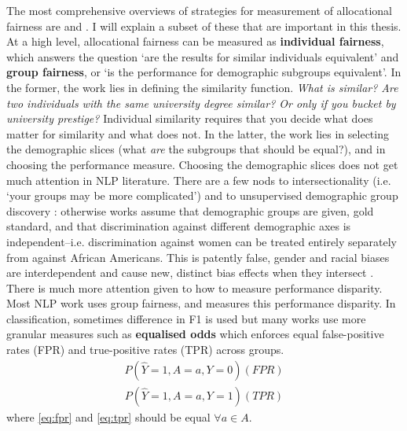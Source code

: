 The most comprehensive overviews of strategies for measurement of allocational fairness are \citet{hutchinson_mitchell_2019} and \citet{barocas-hardt-narayanan}. I will explain a subset of these that are important in this thesis. At a high level, allocational fairness can be measured as \textbf{individual fairness}, which answers the question `are the results for similar individuals equivalent' and \textbf{group fairness}, or `is the performance for demographic subgroups equivalent'. In the former, the work lies in defining the similarity function. \textit{What is similar? Are two individuals with the same university degree similar? Or only if you bucket by university prestige?} Individual similarity requires that you decide what does matter for similarity and what does not. In the latter, the work lies in selecting the demographic slices (what \textit{are} the subgroups that should be equal?), and in choosing the performance measure. Choosing the demographic slices does not get much attention in NLP literature. There are a few nods to intersectionality \citep{subramanian-etal-2021-evaluating,ma-etal-2023-intersectional,lalor-etal-2022-benchmarking, pmlr-v80-kearns18a} (i.e. `your groups may be more complicated') and to unsupervised demographic group discovery \citep{zhao-chang-2020-logan}: otherwise works assume that demographic groups are given, gold standard, and that discrimination against different demographic axes is independent--i.e. discrimination against women can be treated entirely separately from against African Americans. This is patently false, gender and racial biases are interdependent and cause new, distinct bias effects when they intersect \citep{borenstein-etal-2023-measuring}. There is much more attention given to how to measure performance disparity.
Most NLP work uses group fairness, and measures this performance disparity.  In classification, sometimes difference in F1 is used \citep{zhao-etal-2018-gender} but many works use more granular measures such as \textbf{equalised odds} \citep{hardt2016equality} which enforces equal false-positive rates (FPR) and true-positive rates (TPR) across groups.
\begin{align}\label{eq:fpr}
    P(\hat{Y} = 1, A=a, Y=0) (FPR)
\end{align}
\begin{align}\label{eq:tpr}
    P(\hat{Y} = 1, A=a, Y=1) (TPR)
\end{align}
where \ref{eq:fpr} and \ref{eq:tpr} should be equal $\forall a \in A$.

